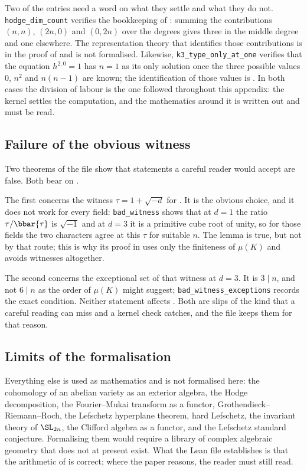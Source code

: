 Two of the entries need a word on what they settle and what they do not.
\texttt{hodge\_dim\_count} verifies the bookkeeping of :
summing the contributions $(n,n)$, $(2n,0)$ and $(0,2n)$ over the degrees
gives three in the middle degree and one elsewhere. The representation theory
that identifies those contributions is in the proof of  and
is not formalised. Likewise, \texttt{k3\_type\_only\_at\_one} verifies that
the equation $h^{2,0}=1$ has $n=1$ as its only solution once the three
possible values $0$, $n^{2}$ and $n(n-1)$ are known; the identification of
those values is . In both cases the division of labour is
the one followed throughout this appendix: the kernel settles the computation,
and the mathematics around it is written out and must be read.

\subsection{Failure of the obvious witness}

Two theorems of the file show that statements a careful reader would accept
are false. Both bear on .

The first concerns the witness $\tau=1+\sqrt{-d}$ for .
It is the obvious choice, and it does not work for every field:
\texttt{bad\_witness} shows that at $d=1$ the ratio $\tau/\bbar{\tau}$ is
$\sqrt{-1}$ and at $d=3$ it is a primitive cube root of unity, so for those
fields the two characters agree at this $\tau$ for suitable $n$. The lemma is
true, but not by that route; this is why its proof in 
uses only the finiteness of $\mu(K)$ and avoids witnesses altogether.

The second concerns the exceptional set of that witness at $d=3$. It is
$3\mid n$, and not $6\mid n$ as the order of $\mu(K)$ might suggest;
\texttt{bad\_witness\_exceptions} records the exact condition. Neither
statement affects . Both are slips of the kind that a
careful reading can miss and a kernel check catches, and the file keeps them
for that reason.

\subsection{Limits of the formalisation}

Everything else is used as mathematics and is not formalised here: the
cohomology of an abelian variety as an exterior algebra, the Hodge
decomposition, the Fourier--Mukai transform as a functor,
Grothendieck--Riemann--Roch, the Lefschetz hyperplane theorem, hard Lefschetz,
the invariant theory of $\SL_{2n}$, the Clifford algebra as a functor, and the
Lefschetz standard conjecture. Formalising them would require a library of
complex algebraic geometry that does not at present exist. What the Lean file
establishes is that the arithmetic of  is correct; where the
paper reasons, the reader must still read.

